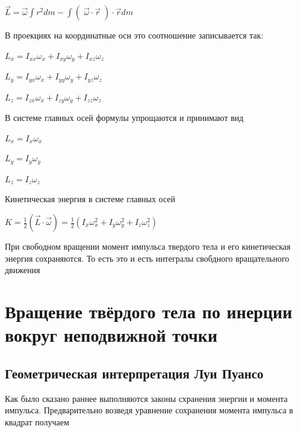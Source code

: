 \documentclass{article}
\begin{document}
\begin{center}
    $\vec{L} = \vec{\omega}\int r^2dm - \int (\;\vec{\omega}\cdot\vec{r}\;)\cdot\vec{r}dm$    
\end{center}

В проекциях на координатные оси это соотношение записывается так:

\begin{center}
$L_x = I_{xx}\omega_x + I_{xy}\omega_y + I_{xz}\omega_z$
\end{center}
\begin{center}
$L_y = I_{yx}\omega_x + I_{yy}\omega_y + I_{yz}\omega_z$
\end{center}
\begin{center}
$L_z = I_{zx}\omega_x + I_{zy}\omega_y + I_{zz}\omega_z$
\end{center}

В системе главных осей формулы упрощаются и принимают вид 

\begin{center}
$L_x = I_{x}\omega_x$
\end{center}
\begin{center}
$L_y = I_{y}\omega_y$
\end{center}
\begin{center}
$L_z = I_{z}\omega_z$
\end{center}

Кинетическая энергия в системе главных осей

\begin{center}
$K = \frac{1}{2}(\vec{L}\cdot\vec{\omega})=\frac{1}{2}(I_x\omega_x^2 + I_y\omega_y^2 + I_z\omega_z^2)$
\end{center}

При свободном вращении момент импульса твердого тела и его кинетическая энергия сохраняются. То есть это и есть интегралы свобдного вращательного движения

\section{Вращение твёрдого тела по инерции вокруг неподвижной точки}

\subsection{Геометрическая интерпретация Луи Пуансо}

Как было сказано раннее выполняются законы схранения энергии и момента импульса. Предварительно возведя уравнение сохранения момента импульса в квадрат получаем 
\end{document}
